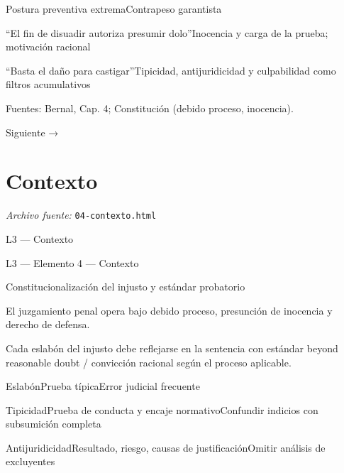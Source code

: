 \documentclass[11pt,a4paper]{article}
\begin{document}
          Postura preventiva extremaContrapeso garantista\par




          “El fin de disuadir autoriza presumir dolo”Inocencia y carga de la prueba; motivación racional\par

          “Basta el daño para castigar”Tipicidad, antijuridicidad y culpabilidad como filtros acumulativos\par







    Fuentes: Bernal, Cap. 4; Constitución (debido proceso, inocencia).\par

    Siguiente →\par

\section{Contexto}
\noindent\textit{Archivo fuente:} \texttt{04-contexto.html}

L3 — Contexto\par





    L3 — Elemento 4 — Contexto\par
    Constitucionalización del injusto y estándar probatorio\par


      El juzgamiento penal opera bajo debido proceso, presunción de inocencia y derecho de defensa.\par
      Cada eslabón del injusto debe reflejarse en la sentencia con estándar beyond reasonable doubt / convicción racional según el proceso aplicable.\par





          EslabónPrueba típicaError judicial frecuente\par




          TipicidadPrueba de conducta y encaje normativoConfundir indicios con subsumición completa\par

          AntijuridicidadResultado, riesgo, causas de justificaciónOmitir análisis de excluyentes\par
\end{document}

